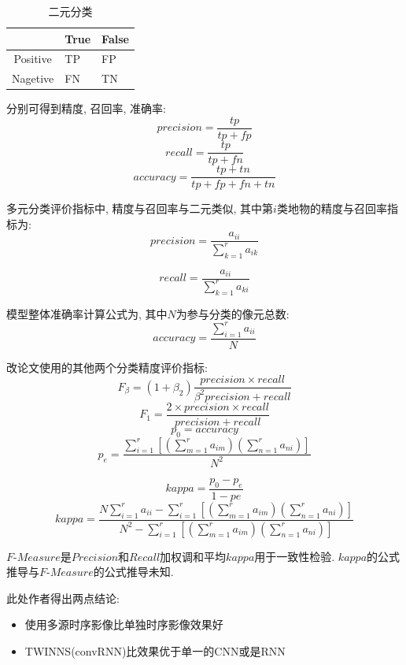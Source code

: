 \begin{table}[!htbp]
    \centering
    \begin{tabular}{c|p{2cm}|p{2cm}}
        \hline
                 & True & False     \\ \hline
        Positive & TP   & FP     \\ \hline
        Nagetive & FN   & TN     \\ \hline
    \end{tabular}
    \caption{二元分类}
\end{table}

分别可得到精度, 召回率, 准确率:
\[precision=\frac{tp}{tp+fp}\]
\[recall=\frac{tp}{tp+fn}\]
\[accuracy=\frac{tp+tn}{tp+fp+fn+tn}\]

多元分类评价指标中, 精度与召回率与二元类似, 其中第$i$类地物的精度与召回率指标为:
\begin{equation*}
    precision=\frac{a_{ii}}{\sum\limits_{k=1}^{r}a_{ik}}
\end{equation*}

\begin{equation*}
    recall=\frac{a_{ii}}{\sum\limits_{k=1}^{r}a_{ki}}
\end{equation*}



模型整体准确率计算公式为, 其中$N$为参与分类的像元总数:
\[accuracy=\frac{\sum\limits_{i=1}^{r}a_{ii}}{N}\]

改论文使用的其他两个分类精度评价指标:
\[F_{\beta}=(1+\beta_{2})\frac{precision\times recall}{\beta^{2}precision+recall}\]
\[F_{1}=\frac{2\times precision\times recall}{precision+recall}\]
\[p_{0}=accuracy\]
\[ p_{e}=\frac{\sum\limits_{i=1}^{r}[(\sum\limits_{m=1}^{r}a_{im})(\sum\limits_{n=1}^{r}a_{ni})]}{N^{2}} \]

\[ kappa=\frac{p_{0}-p_{e}}{1-p{e}} \]
\[
    kappa=\frac
    {N\sum\limits_{i=1}^{r}a_{ii}-\sum\limits_{i=1}^{r}[(\sum\limits_{m=1}^{r}a_{im})(\sum\limits_{n=1}^{r}a_{ni})]}
    {N^{2}-\sum\limits_{i=1}^{r}[(\sum\limits_{m=1}^{r}a_{im})(\sum\limits_{n=1}^{r}a_{ni})]}    
\]

$F\text{-}Measure$是$Precision$和$Recall$加权调和平均$kappa$用于一致性检验. $kappa$的公式推导与$F\text{-}Measure$的公式推导未知. 

此处作者得出两点结论:
\begin{itemize}
    \item 使用多源时序影像比单独时序影像效果好
    \item TWINNS(convRNN)比效果优于单一的CNN或是RNN
\end{itemize}

